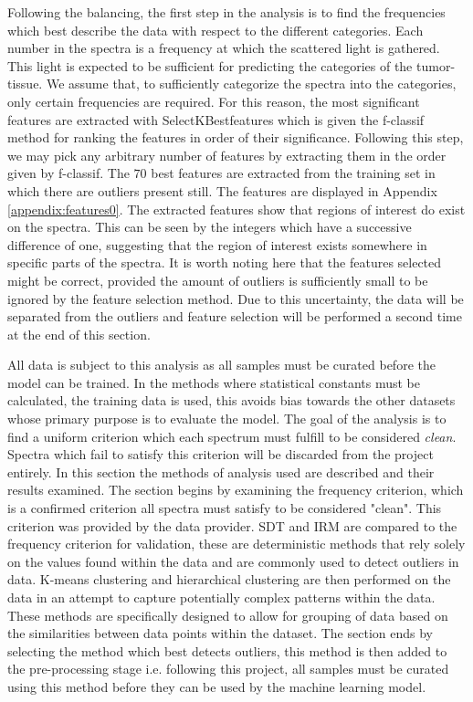 Following the balancing, the first step in the analysis is to find the frequencies which best describe the data with respect to the different categories. Each number in the spectra is a frequency at which the scattered light is gathered. This light is expected to be sufficient for predicting the categories of the tumor-tissue. We assume that, to sufficiently categorize the spectra into the categories, only certain frequencies are required. For this reason, the most significant features are extracted with SelectKBestfeatures \cite{scikit} which is given the f-classif method for ranking the features in order of their significance. Following this step, we may pick any arbitrary number of features by extracting them in the order given by f-classif. The $70$ best features are extracted from the training set in which there are outliers present still. The features are displayed in Appendix \ref{appendix:features0}. The extracted features show that regions of interest do exist on the spectra. This can be seen by the integers which have a successive difference of one, suggesting that the region of interest exists somewhere in specific parts of the spectra. It is worth noting here that the features selected might be correct, provided the amount of outliers is sufficiently small to be ignored by the feature selection method. Due to this uncertainty, the data will be separated from the outliers and feature selection will be performed a second time at the end of this section.

All data is subject to this analysis as all samples must be curated before the model can be trained. In the methods where statistical constants must be calculated, the training data is used, this avoids bias towards the other datasets whose primary purpose is to evaluate the model. The goal of the analysis is to find a uniform criterion which each spectrum must fulfill to be considered \textit{clean}. Spectra which fail to satisfy this criterion will be discarded from the project entirely. In this section the methods of analysis used are described and their results examined. The section begins by examining the frequency criterion, which is a confirmed criterion all spectra must satisfy to be considered "clean". This criterion was provided by the data provider. SDT and IRM are compared to the frequency criterion for validation, these are deterministic methods that rely solely on the values found within the data and are commonly used to detect outliers in data. K-means clustering and hierarchical clustering are then performed on the data in an attempt to capture potentially complex patterns within the data. These methods are specifically designed to allow for grouping of data based on the similarities between data points within the dataset. The section ends by selecting the method which best detects outliers, this method is then added to the pre-processing stage i.e. following this project, all samples must be curated using this method before they can be used by the machine learning model. 


